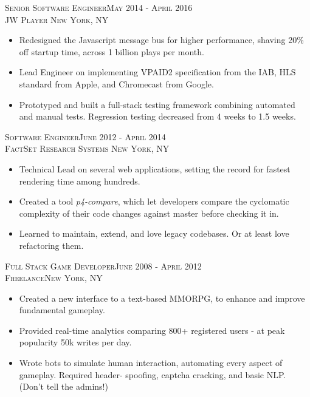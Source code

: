 \documentclass[oneside, final]{scrartcl}
\begin{document}
\begin{center}
\textsc{Senior Software Engineer\hfill May 2014 - April 2016\\}
\textsc{JW Player \hfill New York, NY\\}
\begin{itemize}
	\setlength{\itemsep}{1pt}
	\setlength{\itemsep}{1pt}
	\setlength{\parskip}{0pt}
	\setlength{\parsep}{0pt}
	\setlength{\leftmargin}{-5mm}
        \item Redesigned the Javascript message bus for higher performance, shaving 20\% off startup time, across 1 billion plays per month.
        \item Lead Engineer on implementing VPAID2 specification from the IAB, HLS standard from Apple, and Chromecast from Google.
        \item Prototyped and built a full-stack testing framework combining automated and manual tests. Regression testing decreased from 4 weeks to 1.5 weeks.
\end{itemize}

\textsc{Software Engineer\hfill June 2012 - April 2014\\}
\textsc{FactSet Research Systems \hfill New York, NY\\}
\begin{itemize}
	\setlength{\itemsep}{1pt}
	\setlength{\parskip}{0pt}
	\setlength{\parsep}{0pt}
	\setlength{\leftmargin}{-5mm}
	\item Technical Lead on several web applications, setting the record for fastest rendering time among hundreds.
	\item Created a tool \textit{p4-compare}, which let developers compare the cyclomatic complexity of their code
	changes against master before checking it in.
	\item Learned to maintain, extend, and love legacy codebases. Or at least love refactoring them.
\end{itemize}

\textsc{Full Stack Game Developer\hfill June 2008 - April 2012\\}
\textsc{Freelance\hfill New York, NY\\}
\begin{itemize}
	\setlength{\itemsep}{1pt}
	\setlength{\parskip}{0pt}
	\setlength{\parsep}{0pt}
	\setlength{\leftmargin}{-5mm}
	\item Created a new interface to a text-based MMORPG, to enhance and improve fundamental gameplay.
    \item Provided real-time analytics comparing 800+ registered users - at peak popularity 50k writes per day.
    \item Wrote bots to simulate human interaction, automating every aspect of gameplay. Required header-
            spoofing, captcha cracking, and basic NLP. (Don’t tell the admins!)
\end{itemize}



\end{center}
\end{document}
